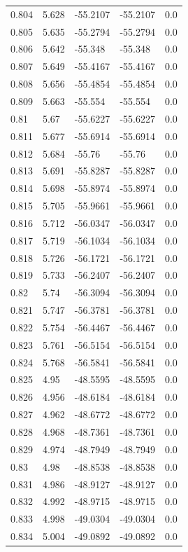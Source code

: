 \begin{table}[H]
\begin{tabular}{lllll}
0.804 & 5.628 & -55.2107 & -55.2107 & 0.0 \\
0.805 & 5.635 & -55.2794 & -55.2794 & 0.0 \\
0.806 & 5.642 & -55.348 & -55.348 & 0.0 \\
0.807 & 5.649 & -55.4167 & -55.4167 & 0.0 \\
0.808 & 5.656 & -55.4854 & -55.4854 & 0.0 \\
0.809 & 5.663 & -55.554 & -55.554 & 0.0 \\
0.81 & 5.67 & -55.6227 & -55.6227 & 0.0 \\
0.811 & 5.677 & -55.6914 & -55.6914 & 0.0 \\
0.812 & 5.684 & -55.76 & -55.76 & 0.0 \\
0.813 & 5.691 & -55.8287 & -55.8287 & 0.0 \\
0.814 & 5.698 & -55.8974 & -55.8974 & 0.0 \\
0.815 & 5.705 & -55.9661 & -55.9661 & 0.0 \\
0.816 & 5.712 & -56.0347 & -56.0347 & 0.0 \\
0.817 & 5.719 & -56.1034 & -56.1034 & 0.0 \\
0.818 & 5.726 & -56.1721 & -56.1721 & 0.0 \\
0.819 & 5.733 & -56.2407 & -56.2407 & 0.0 \\
0.82 & 5.74 & -56.3094 & -56.3094 & 0.0 \\
0.821 & 5.747 & -56.3781 & -56.3781 & 0.0 \\
0.822 & 5.754 & -56.4467 & -56.4467 & 0.0 \\
0.823 & 5.761 & -56.5154 & -56.5154 & 0.0 \\
0.824 & 5.768 & -56.5841 & -56.5841 & 0.0 \\
0.825 & 4.95 & -48.5595 & -48.5595 & 0.0 \\
0.826 & 4.956 & -48.6184 & -48.6184 & 0.0 \\
0.827 & 4.962 & -48.6772 & -48.6772 & 0.0 \\
0.828 & 4.968 & -48.7361 & -48.7361 & 0.0 \\
0.829 & 4.974 & -48.7949 & -48.7949 & 0.0 \\
0.83 & 4.98 & -48.8538 & -48.8538 & 0.0 \\
0.831 & 4.986 & -48.9127 & -48.9127 & 0.0 \\
0.832 & 4.992 & -48.9715 & -48.9715 & 0.0 \\
0.833 & 4.998 & -49.0304 & -49.0304 & 0.0 \\
0.834 & 5.004 & -49.0892 & -49.0892 & 0.0 \\

\end{tabular}
\end{table}
